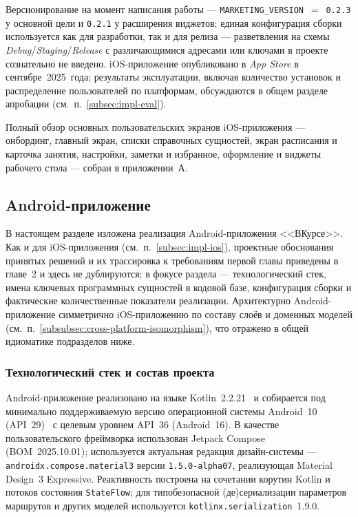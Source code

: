 Версионирование на момент написания работы --- \texttt{MARKETING\_\allowbreak VERSION}~$=$~\texttt{0.2.3} у основной цели и \texttt{0.2.1} у расширения виджетов; единая конфигурация сборки используется как для разработки, так и для релиза --- разветвления на схемы \emph{Debug}/\emph{Staging}/\emph{Release} с различающимися адресами или ключами в проекте сознательно не введено. iOS-приложение опубликовано в \emph{App Store} в сентябре~2025~года; результаты эксплуатации, включая количество установок и распределение пользователей по платформам, обсуждаются в общем разделе апробации (см.~п.~\ref{subsec:impl-eval}).

Полный обзор основных пользовательских экранов iOS-приложения --- онбординг, главный экран, списки справочных сущностей, экран расписания и карточка занятия, настройки, заметки и избранное, оформление и виджеты рабочего стола --- собран в приложении~А.

\subsection{Android-приложение}
\label{subsec:impl-android}

В настоящем разделе изложена реализация Android-приложения <<ВКурсе>>. Как и для iOS-приложения (см.~п.~\ref{subsec:impl-ios}), проектные обоснования принятых решений и их трассировка к требованиям первой главы приведены в главе~2 и здесь не дублируются; в фокусе раздела --- технологический стек, имена ключевых программных сущностей в кодовой базе, конфигурация сборки и фактические количественные показатели реализации. Архитектурно Android-приложение симметрично iOS-приложению по составу слоёв и доменных моделей (см.~п.~\ref{subsubsec:cross-platform-isomorphism}), что отражено в общей идиоматике подразделов ниже.

\subsubsection{Технологический стек и состав проекта}
\label{subsubsec:impl-android-stack}

Android-приложение реализовано на языке Kotlin~2.2.21~\cite{dzhemerov-kotlin, jetbrains-kotlin} и собирается под минимально поддерживаемую версию операционной системы Android~10 (API~29)~\cite{android-developers} с целевым уровнем API~36 (Android~16). В качестве пользовательского фреймворка использован Jetpack Compose~\cite{jetpack-compose} (BOM~2025.10.01); используется актуальная редакция дизайн-системы --- \texttt{androidx.\allowbreak compose.\allowbreak material3} версии \texttt{1.5.0-\allowbreak alpha07}, реализующая Material Design~3 Expressive. Реактивность построена на сочетании корутин Kotlin и потоков состояния \texttt{StateFlow}; для типобезопасной (де)сериализации параметров маршрутов и других моделей используется \texttt{kotlinx.\allowbreak serialization}~1.9.0.

